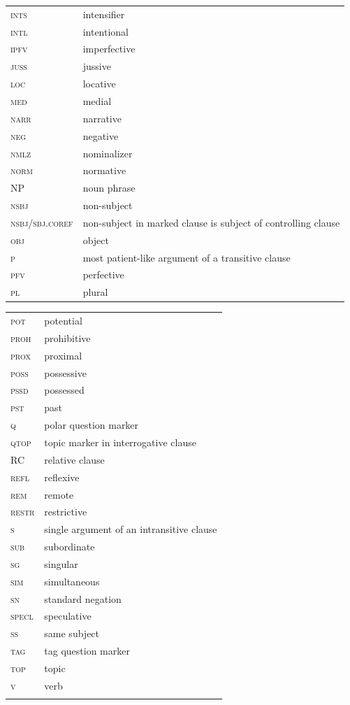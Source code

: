 \documentclass[output=paper,colorlinks,citecolor=brown,draft]{langscibook}
\begin{document}
\begin{tabularx}{.45\textwidth}{lQ}
\scshape ints & intensifier \\
\scshape intl & intentional \\
\scshape ipfv & imperfective \\
\scshape juss & jussive \\
\scshape loc & locative \\
\scshape med & medial \\
\scshape narr & narrative \\
\scshape neg & negative \\
\scshape nmlz & nominalizer \\
\scshape norm & normative \\
\scshape NP & noun phrase \\
\scshape nsbj & non-subject \\
\scshape nsbj/sbj.coref & non-subject in marked clause is subject of controlling clause \\
\scshape obj & object \\
\scshape p & most patient-like argument of a transitive clause \\
\scshape pfv & perfective \\
\scshape pl & plural \\
\end{tabularx}%
\begin{tabularx}{.54\textwidth}{lQ}%
\scshape pot & potential \\
\scshape proh & prohibitive \\
\scshape prox & proximal \\
\scshape poss & possessive \\
\scshape pssd & possessed \\
\scshape pst & past \\
\scshape q & polar question marker \\
\scshape qtop & topic marker in interrogative clause \\
\scshape RC & relative clause \\
\scshape refl & reflexive \\
\scshape rem & remote  \\
\scshape restr & restrictive \\
\scshape s & single argument of an intransitive clause \\
\scshape sub & subordinate \\
\scshape sg & singular \\
\scshape sim & simultaneous \\
\scshape sn & standard negation \\
\scshape specl & speculative \\
\scshape ss & same subject \\
\scshape tag & tag question marker \\
\scshape top & topic \\
\scshape v & verb \\
\\
\end{tabularx}

\largerpage
\sloppy\printbibliography[heading=subbibliography,notkeyword=this]
\end{document}
